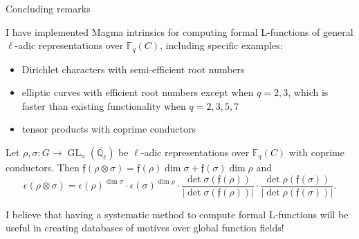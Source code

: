\documentclass[10pt]{beamer}
\begin{document}
\begin{frame}[t]{Concluding remarks}

I have implemented Magma intrinsics for computing formal L-functions of general $ \ell $-adic representations over $ \mathbb{F}_q(C) $, including specific examples:
\begin{itemize}
\item Dirichlet characters with semi-efficient root numbers
\item elliptic curves with efficient root numbers except when $ q = 2, 3 $, which is faster than existing functionality when $ q = 2, 3, 5, 7 $
\item tensor products with coprime conductors
\end{itemize}

\begin{theorem}
Let $ \rho, \sigma : G \to \operatorname{GL}_n(\overline{\mathbb{Q}_\ell}) $ be $ \ell $-adic representations over $ \mathbb{F}_q(C) $ with coprime conductors. Then $ \mathfrak{f}(\rho \otimes \sigma) = \mathfrak{f}(\rho)\dim\sigma + \mathfrak{f}(\sigma)\dim\rho $ and
$$ \epsilon(\rho \otimes \sigma) = \epsilon(\rho)^{\dim\sigma} \cdot \epsilon(\sigma)^{\dim\rho} \cdot \dfrac{\det\sigma(\mathfrak{f}(\rho))}{|\det\sigma(\mathfrak{f}(\rho))|} \cdot \dfrac{\det\rho(\mathfrak{f}(\sigma))}{|\det\rho(\mathfrak{f}(\sigma))|}. $$
\end{theorem}

I believe that having a systematic method to compute formal L-functions will be useful in creating databases of motives over global function fields!

\end{frame}
\end{document}
